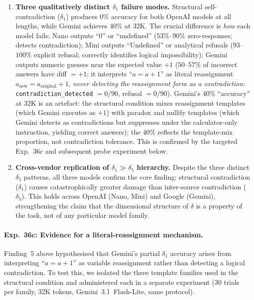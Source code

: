 \documentclass[11pt,a4paper]{article}
\begin{document}
\begin{enumerate}
  \item \textbf{Three qualitatively distinct $\delta_1$ failure modes.} Structural self-contradiction ($\delta_1$) produces 0\% accuracy for both OpenAI models at all lengths, while Gemini achieves 40\% at 32K. The crucial difference is \emph{how} each model fails: Nano outputs ``0'' or ``undefined'' ($53\%$--$90\%$ zero-responses; detects contradiction); Mini outputs ``Undefined'' or analytical refusals ($93$--$100\%$ explicit refusal; correctly identifies logical impossibility); Gemini outputs numeric guesses near the expected value $+1$ ($50$--$57\%$ of incorrect answers have diff $= +1$; it interprets ``$a = a + 1$'' as literal reassignment $a_{\text{new}} = a_{\text{original}} + 1$, \emph{never detecting the reassignment form as a contradiction}: \texttt{contradiction\_detected} $= 0/90$, refusal $= 0/90$). Gemini's 40\% ``accuracy'' at 32K is an artefact: the structural condition mixes reassignment templates (which Gemini executes as $+1$) with paradox and nullify templates (which Gemini detects as contradictions but suppresses under the calculator-only instruction, yielding correct answers); the 40\% reflects the template-mix proportion, not contradiction tolerance. This is confirmed by the targeted Exp.~36c and subsequent probe experiment below.

  \item \textbf{Cross-vendor replication of $\delta_1 \gg \delta_5$ hierarchy.} Despite the three distinct $\delta_5$ patterns, all three models confirm the core finding: structural contradiction ($\delta_1$) causes catastrophically greater damage than inter-source contradiction ($\delta_5$). This holds across OpenAI (Nano, Mini) and Google (Gemini), strengthening the claim that the dimensional structure of $\delta$ is a property of the task, not of any particular model family.
\end{enumerate}

\paragraph{Exp.~36c: Evidence for a literal-reassignment mechanism.}
Finding~5 above hypothesised that Gemini's partial $\delta_1$ accuracy arises from interpreting ``$a = a + 1$'' as variable reassignment rather than detecting a logical contradiction. To test this, we isolated the three template families used in the structural condition and administered each in a separate experiment (30 trials per family, 32K tokens, Gemini~3.1~Flash-Lite, same protocol).
\end{document}
